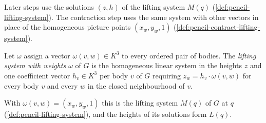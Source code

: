 Later steps use the solutions $(z, h)$ of the lifting system $M(q)$
(\cref{def:pencil-lifting-system}). The contraction step uses the same
system with other vectors in place of the homogeneous picture points
$(x_w, y_w, 1)$ (\cref{def:pencil-contract-lifting-system}).

\begin{definition}
  \label{def:pencil-weighted-lifting-system}
  \leanok
  Let $\omega$ assign a vector $\omega(v, w) \in K^3$ to every ordered
  pair of bodies. The \emph{lifting system with weights $\omega$} of $G$
  is the homogeneous linear system in the heights $z$ and one coefficient
  vector $h_v \in K^3$ per body $v$ of $G$ requiring
  $z_w = h_v \cdot \omega(v, w)$ for every body $v$ and every $w$ in the
  closed neighbourhood of $v$.
\end{definition}

With $\omega(v, w) = (x_w, y_w, 1)$ this is the lifting system $M(q)$
of $G$ at $q$ (\cref{def:pencil-lifting-system}), and the heights of
its solutions form $L(q)$.

